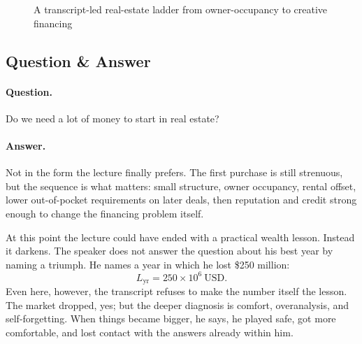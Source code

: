 \begin{figure}[h]
\centering
{}
\caption{A transcript-led real-estate ladder from owner-occupancy to creative financing}
\end{figure}

\subsection{Question \& Answer}

\paragraph{Question.} Do we need a lot of money to start in real estate?

\paragraph{Answer.} Not in the form the lecture finally prefers. The first purchase is still strenuous, but the sequence is what matters: small structure, owner occupancy, rental offset, lower out-of-pocket requirements on later deals, then reputation and credit strong enough to change the financing problem itself.

At this point the lecture could have ended with a practical wealth lesson. Instead it darkens. The speaker does not answer the question about his best year by naming a triumph. He names a year in which he lost \$250 million:
\begin{equation}
L_{\mathrm{yr}}=250\times 10^{6}\ \mathrm{USD}.
\end{equation}
Even here, however, the transcript refuses to make the number itself the lesson. The market dropped, yes; but the deeper diagnosis is comfort, overanalysis, and self-forgetting. When things became bigger, he says, he played safe, got more comfortable, and lost contact with the answers already within him.

